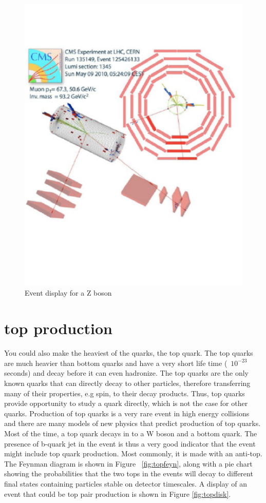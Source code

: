 \begin{figure}[h]
\centering\includegraphics[scale=0.5]{./protonprotoncollisions/Pictures/wzevent.pdf}
\caption{Event display for a Z boson}
\label{fig:wzevent}
\end{figure}

\section{top production}

You could also make the heaviest of the quarks, the top quark.  The top quarks are much heavier than bottom quarks and have a very short life time (~$10^{-23}$ seconds) and decay before it can even hadronize. The top quarks are the only known quarks that can directly decay to other particles, therefore transferring many of their properties, e.g spin, to their decay products. Thus, top quarks provide opportunity to study a quark directly, which is not the case for other quarks. Production of top quarks is a very rare event in high energy collisions and there are many models of new physics that predict production of top quarks. Most of the time, a top quark decays in to a W boson and a bottom quark. The presence of b-quark jet in the event is thus a very good indicator that the event might include top quark production. Most commonly, it is made with an anti-top. The Feynman diagram is shown in Figure ~\ref{fig:topfeyn}, along with a pie chart showing the probabilities that the two tops in the events will decay to different final states containing particles stable on detector timescales. A display of an event that could be top pair production is shown in Figure \ref{fig:topdisk}.

